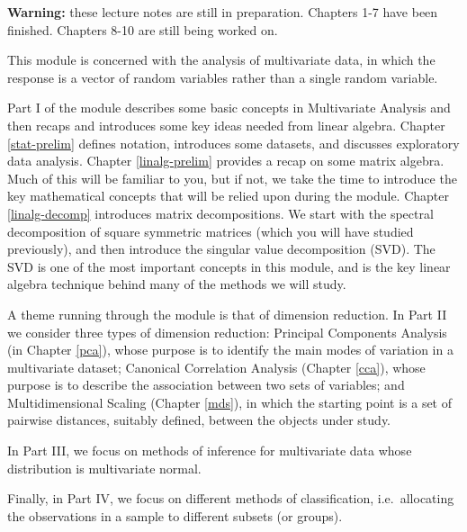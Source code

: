 \documentclass[]{book}
\theoremstyle{definition}
\theoremstyle{definition}
\theoremstyle{definition}
\theoremstyle{remark}
\begin{document}
\newcommand{\tcov}{\text{cov}}
\newcommand{\texp}{\text{exp}}
\newcommand{\lb}{\left(}
\newcommand{\rb}{\right)}
\newcommand{\lsb}{\left[}
\newcommand{\rsb}{\right]}
\newcommand{\BE}{{\mathbb{E}}}
\newcommand{\BP}{{\mathbb{P}}}
\newcommand{\cov}{{\mathbb{C}\operatorname{ov}}}
\newcommand{\var}{{\mathbb{V}\operatorname{ar}}}
\newcommand{\cor}{{\mathbb{C}\operatorname{or}}}

\textbf{Warning:} these lecture notes are still in preparation. Chapters 1-7 have been finished. Chapters 8-10 are still being worked on.

This module is concerned with the analysis of multivariate data, in which the response is a vector of random variables rather than a single random variable.

Part I of the module describes some basic concepts in Multivariate Analysis and then recaps and introduces some key ideas needed from linear algebra.
Chapter \ref{stat-prelim} defines notation, introduces some datasets, and discusses exploratory data analysis. Chapter \ref{linalg-prelim} provides a recap on some matrix algebra. Much of this will be familiar to you, but if not, we take the time to introduce the key mathematical concepts that will be relied upon during the module. Chapter \ref{linalg-decomp} introduces matrix decompositions. We start with the spectral decomposition of square symmetric matrices (which you will have studied previously), and then introduce the singular value decomposition (SVD). The SVD is one of the most important concepts in this module, and is the key linear algebra technique behind many of the methods we will study.

A theme running through the module is that of dimension reduction. In Part II we consider three types of dimension reduction: Principal Components Analysis (in Chapter \ref{pca}),
whose purpose is to identify the main modes of variation in a multivariate dataset; Canonical Correlation Analysis (Chapter \ref{cca}), whose purpose is to describe the association between two sets of variables; and Multidimensional Scaling (Chapter \ref{mds}), in which the starting point is a set of pairwise distances, suitably defined, between the objects under study.

In Part III, we focus on methods of inference for multivariate data whose distribution is multivariate normal.

Finally, in Part IV, we focus on different methods of classification, i.e.~allocating the observations in a sample to different subsets (or groups).
\end{document}
